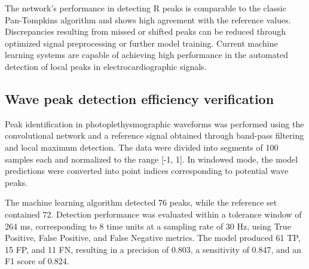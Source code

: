 \documentclass[journal]{IEEEtran}
\begin{document}
\newpage
The network’s performance in detecting R peaks is comparable to the classic Pan-Tompkins algorithm and shows high agreement with the reference values. Discrepancies resulting from missed or shifted peaks can be reduced through optimized signal preprocessing or further model training. Current machine learning systems are capable of achieving high performance in the automated detection of local peaks in electrocardiographic signals.

\subsection{Wave peak detection efficiency verification}
Peak identification in photoplethysmographic waveforms was performed using the convolutional network and a reference signal obtained through band-pass filtering and local maximum detection. The data were divided into segments of 100 samples each and normalized to the range [-1, 1]. In windowed mode, the model predictions were converted into point indices corresponding to potential wave peaks.

The machine learning algorithm detected 76 peaks, while the reference set contained 72. Detection performance was evaluated within a tolerance window of 264 ms, corresponding to 8 time units at a sampling rate of 30 Hz, using True Positive, False Positive, and False Negative metrics. The model produced 61 TP, 15 FP, and 11 FN, resulting in a precision of 0.803, a sensitivity of 0.847, and an F1 score of 0.824.
\end{document}
